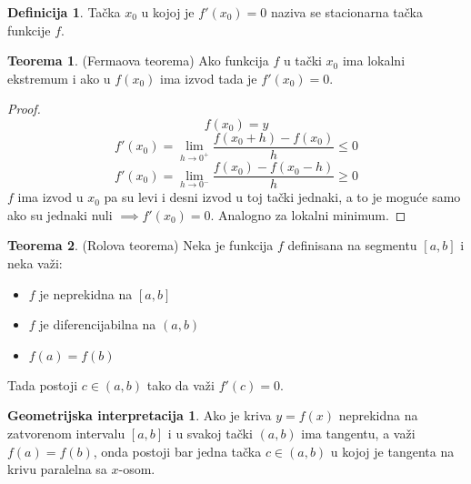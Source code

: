 \documentclass{article}
\theoremstyle{definition}
\newtheorem{definition}{Definicija}[section]
\newtheorem{ginterpretation}{Geometrijska interpretacija}[section]
\newtheorem{theorem}{Teorema}[section]
\begin{document}
        \begin{definition}
            Tačka $x_0$ u kojoj je $f'(x_0) = 0$ naziva se stacionarna tačka funkcije $f$.
        \end{definition}

        \begin{theorem}
            (Fermaova teorema) Ako funkcija $f$ u tački $x_0$ ima lokalni ekstremum i ako u $f(x_0)$ ima izvod tada je $f'(x_0) = 0$.
        \end{theorem}
        \begin{proof}
            $$f(x_0) = y$$
            $$f'(x_0) = \lim_{h \to 0^{+}} \frac{f(x_0 + h) - f(x_0)}{h} \leq 0$$
            $$f'(x_0) = \lim_{h \to 0^{-}} \frac{f(x_0) - f(x_0 - h)}{h} \geq 0$$
            $f$ ima izvod u $x_0$ pa su levi i desni izvod u toj tački jednaki, a to je moguće samo ako su jednaki nuli $\implies f'(x_0) = 0$.
            Analogno za lokalni minimum.
        \end{proof}

        \begin{theorem}
            (Rolova teorema) Neka je funkcija $f$ definisana na segmentu $[a, b]$ i neka važi:
            \begin{itemize}
                \item $f$ je neprekidna na $[a, b]$
                \item $f$ je diferencijabilna na $(a, b)$
                \item $f(a) = f(b)$
            \end{itemize}
            Tada postoji $c \in (a, b)$ tako da važi $f'(c) = 0$.
        \end{theorem}
        \begin{ginterpretation}
            Ako je kriva $y = f(x)$ neprekidna na zatvorenom intervalu $[a, b]$ i u svakoj tački $(a, b)$ ima tangentu, a važi $f(a) = f(b)$, onda postoji bar jedna tačka $c \in (a, b)$ u kojoj je tangenta na krivu paralelna sa $x$-osom.
        \end{ginterpretation}
\end{document}
